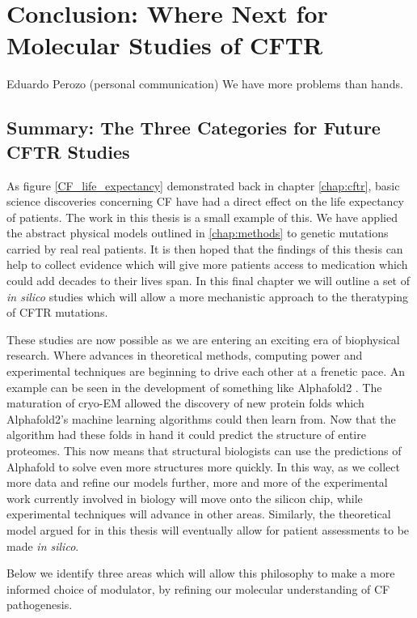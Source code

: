 \chapter{Conclusion: Where Next for Molecular Studies of CFTR}
\label{chap:conclusion}
\begin{chapquote} {Eduardo Perozo (personal communication)}
We have more problems than hands. 
\end{chapquote}


\section{Summary: The Three Categories for Future CFTR Studies}

As figure \ref{CF_life_expectancy} demonstrated back in chapter \ref{chap:cftr}, basic science discoveries concerning CF have had a direct effect on the life expectancy of patients. The work in this thesis is a small example of this. We have applied the abstract physical models outlined in \ref{chap:methods} to genetic mutations carried by real real patients. It is then hoped that the findings of this thesis can help to collect evidence which will give more patients access to medication which could add decades to their lives span. In this final chapter we will outline a set of \textit{in silico} studies which will allow a more mechanistic approach to the theratyping of CFTR mutations.  

These studies are now possible as we are entering an exciting era of biophysical research. Where advances in theoretical methods, computing power and experimental techniques are beginning to drive each other at a frenetic pace. An example can be seen in the development of something like Alphafold2 \cite{jumper2021}. The maturation of cryo-EM allowed the discovery of new protein folds which Alphafold2's machine learning algorithms could then learn from. Now that the algorithm had these folds in hand it could predict the structure of entire proteomes. This now means that structural biologists can use the predictions of Alphafold to solve even more structures more quickly. In this way, as we collect more data and refine our models further, more and more of the experimental work currently involved in biology will move onto the silicon chip, while experimental techniques will advance in other areas. Similarly, the theoretical model argued for in this thesis will eventually allow for patient assessments to be made \textit{in silico}.

Below we identify three areas which will allow this philosophy to make a more informed choice of modulator, by refining our molecular understanding of CF pathogenesis.

